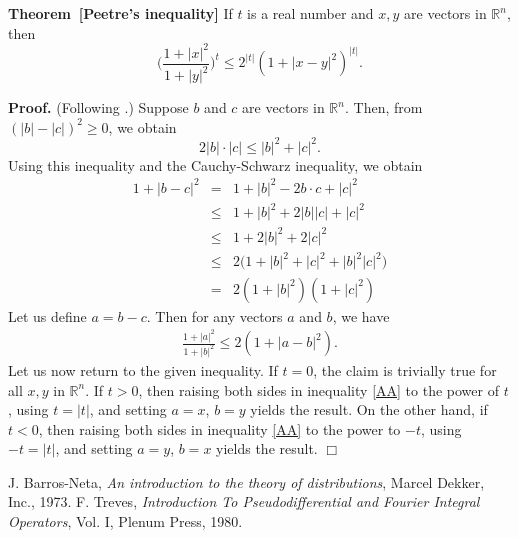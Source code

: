\documentclass[12pt]{article}
\newcommand{\sR}[0]{\mathbb{R}}
\begin{document}
{\bf Theorem\, [Peetre's inequality]}  \cite{barros, trevesI}
If $t$ is a real number and $x,y$ are vectors in
$\sR^n$, then
$$ \Big( \frac{1+|x|^2}{1+|y|^2} \Big)^t \le 2^{|t|} (1+|x-y|^2)^{|t|}.$$

{\bf Proof.} (Following \cite{barros}.)
Suppose $b$ and $c$ are vectors in $\sR^n$. Then, from
$(|b|-|c|)^2\ge 0$, we obtain
$$ 2|b| \cdot |c| \le |b|^2 + |c|^2.$$
Using this inequality and the Cauchy-Schwarz inequality, we obtain
\begin{eqnarray*}
1+ |b-c|^2 &=& 1+ |b|^2 - 2 b\cdot c + |c|^2 \\
&\le & 1+ |b|^2 + 2 |b| |c| + |c|^2 \\
&\le & 1+ 2|b|^2 + 2|c|^2 \\
&\le & 2\big( 1+|b|^2+ |c|^2+|b|^2 |c|^2\big)\\
&= & 2( 1+|b|^2)(1+ |c|^2)
\end{eqnarray*}
Let us define $a=b-c$. Then for any vectors $a$ and $b$, we have
\begin{eqnarray}
\label{AA}
    \frac{1+|a|^2}{1+|b|^2}   \le 2 (1+|a-b|^2).
\end{eqnarray}
Let us now return to the given inequality.
If $t=0$, the claim is trivially true for all $x,y$ in $\sR^n$.
If $t>0$, then raising both sides in inequality \ref{AA} to
the power of $t$, using $t=|t|$, and setting $a=x$, $b=y$ yields the result.
On the other hand, if $t<0$, then raising both sides in inequality
\ref{AA} to the power to $-t$, using $-t=|t|$, and setting
$a=y$, $b=x$ yields the result.
$\Box$


\begin{thebibliography}{9}
  J. Barros-Neta, \emph{An introduction to the theory of distributions},
 Marcel Dekker, Inc., 1973.
  F. Treves,
 \emph{Introduction To Pseudodifferential and Fourier Integral Operators},
Vol. I, Plenum Press, 1980.
 \end{thebibliography}
\end{document}
